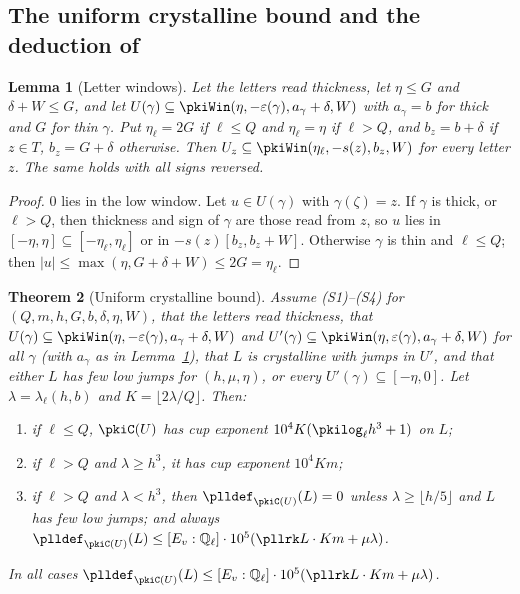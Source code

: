 \documentclass[10pt]{amsart}
\newtheorem{theorem}{Theorem}[section]
\newtheorem{lemma}[theorem]{Lemma}
\theoremstyle{definition}
\theoremstyle{remark}
\newcommand{\Q}{\mathbb Q}
\begin{document}
\subsection{The uniform crystalline bound and the deduction of \texorpdfstring{{\cite[Theorem~5.8]{P55}}}{[Galois, Theorem~5.8]}}\label{pki:ss-deduce}

\begin{lemma}[Letter windows]\label{pki:letterwin}
Let the letters read thickness, let $\eta\le G$ and $\delta+W\le G$, and let $U(\gamma)\subseteq
\pkiWin(\eta,-\varepsilon(\gamma),a_\gamma+\delta,W)$ with $a_\gamma=b$ for thick and $G$ for thin
$\gamma$. Put $\eta_\ell=2G$ if $\ell\le Q$ and $\eta_\ell=\eta$ if $\ell>Q$, and $b_z=b+\delta$ if
$z\in T$, $b_z=G+\delta$ otherwise. Then $U_z\subseteq\pkiWin(\eta_\ell,-s(z),b_z,W)$ for every
letter $z$. The same holds with all signs reversed.
\end{lemma}

\begin{proof}
$0$ lies in the low window. Let $u\in U(\gamma)$ with $\gamma(\zeta)=z$. If $\gamma$ is thick, or
$\ell>Q$, then thickness and sign of $\gamma$ are those read from $z$, so $u$ lies in
$[-\eta,\eta]\subseteq[-\eta_\ell,\eta_\ell]$ or in $-s(z)[b_z,b_z+W]$. Otherwise $\gamma$ is thin and
$\ell\le Q$; then $|u|\le\max(\eta,G+\delta+W)\le2G=\eta_\ell$.
\end{proof}

\begin{theorem}[Uniform crystalline bound]\label{pki:crys}
Assume (S1)--(S4) for $(Q,m,h,G,b,\delta,\eta,W)$, that the letters read thickness, that
$U(\gamma)\subseteq\pkiWin(\eta,-\varepsilon(\gamma),a_\gamma+\delta,W)$ and
$U'(\gamma)\subseteq\pkiWin(\eta,\varepsilon(\gamma),a_\gamma+\delta,W)$ for all $\gamma$ (with
$a_\gamma$ as in Lemma~\ref{pki:letterwin}), that $L$ is crystalline with jumps in $U'$, and that
either $L$ has few low jumps for $(h,\mu,\eta)$, or every $U'(\gamma)\subseteq[-\eta,0]$. Let
$\lambda=\lambda_\ell(h,b)$ and $K=\lfloor2\lambda/Q\rfloor$. Then:
\begin{enumerate}
\item[(b)] if $\ell\le Q$, $\pkiC(U)$ has cup exponent $10^4K(\pkilog_\ell h^3+1)$ on $L$;
\item[(c)] if $\ell>Q$ and $\lambda\ge h^3$, it has cup exponent $10^4Km$;
\item[(d)] if $\ell>Q$ and $\lambda<h^3$, then $\plldef_{\pkiC(U)}(L)=0$ unless $\lambda\ge\lfloor
h/5\rfloor$ and $L$ has few low jumps; and always
$\plldef_{\pkiC(U)}(L)\le[E_v:\Q_\ell]\cdot10^5(\pllrk L\cdot Km+\mu\lambda)$.
\end{enumerate}
In all cases $\plldef_{\pkiC(U)}(L)\le[E_v:\Q_\ell]\cdot10^5(\pllrk L\cdot Km+\mu\lambda)$.
\end{theorem}
\end{document}
